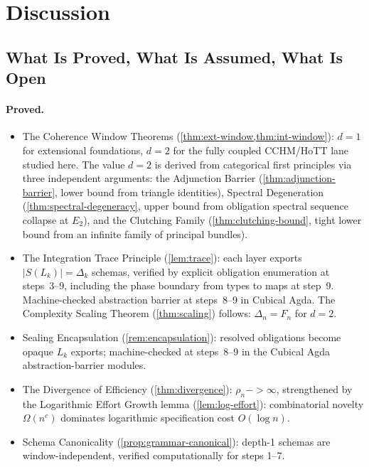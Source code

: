 \documentclass[11pt,a4paper]{article}
\def\to{->}%
\theoremstyle{plain}
\theoremstyle{definition}
\theoremstyle{remark}
\begin{document}
\section{Discussion}
\label{sec:discussion}

\subsection{What Is Proved, What Is Assumed, What Is Open}

\paragraph{Proved.}
\begin{itemize}[nosep]
    \item The Coherence Window Theorems (\cref{thm:ext-window,thm:int-window}): $d = 1$ for extensional foundations, $d = 2$ for the fully coupled CCHM/HoTT lane studied here.  The value $d = 2$ is derived from categorical first principles via three independent arguments: the Adjunction Barrier (\cref{thm:adjunction-barrier}, lower bound from triangle identities), Spectral Degeneration (\cref{thm:spectral-degeneracy}, upper bound from obligation spectral sequence collapse at $E_2$), and the Clutching Family (\cref{thm:clutching-bound}, tight lower bound from an infinite family of principal bundles).
    \item The Integration Trace Principle (\cref{lem:trace}): each layer exports $|S(L_k)| = \Delta_k$ schemas, verified by explicit obligation enumeration at steps~3--9, including the phase boundary from types to maps at step~9.  Machine-checked abstraction barrier at steps~8--9 in Cubical Agda.
    The Complexity Scaling Theorem (\cref{thm:scaling}) follows: $\Delta_n = F_n$ for $d = 2$.
    \item Sealing Encapsulation (\cref{rem:encapsulation}): resolved obligations become opaque $L_k$ exports; machine-checked at steps~8--9 in the Cubical Agda abstraction-barrier modules.
    \item The Divergence of Efficiency (\cref{thm:divergence}): $\rho_n \to \infty$, strengthened by the Logarithmic Effort Growth lemma (\cref{lem:log-effort}): combinatorial novelty $\Omega(n^c)$ dominates logarithmic specification cost $O(\log n)$.
    \item Schema Canonicality (\cref{prop:grammar-canonical}): depth-1 schemas are window-independent, verified computationally for steps 1--7.

\end{itemize}
\end{document}

